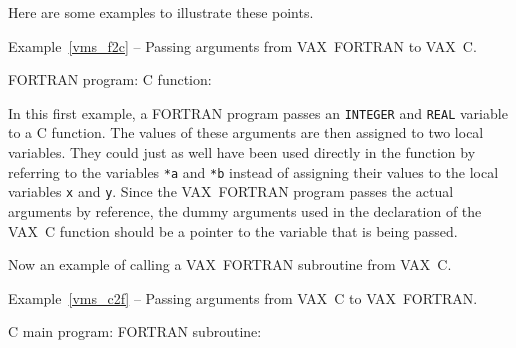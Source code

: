 \documentclass[twoside,11pt]{article}
\newcommand{\latex}[1]{#1}
\renewcommand{\_}{\texttt{\symbol{95}}}
\newcounter{examples}
\begin{document}
Here are some examples to illustrate these points. 

\label{vms_f2c}
\begin{center}
Example\latex{~\ref{vms_f2c}}
-- Passing arguments from VAX~FORTRAN to VAX~C\@.
\end{center}
\nopagebreak[4]
FORTRAN program:
\pagebreak[1]
C function:

In this first example, a FORTRAN program passes an \texttt{INTEGER} and 
\texttt{REAL} variable to a C function. 
The values of these arguments are then assigned to two local
variables. They could just as well have been used directly in the function by
referring to the variables  \texttt{*a} and \texttt{*b} instead of
assigning their values to the local variables \texttt{x} and \texttt{y}. 
Since the VAX~FORTRAN program passes the actual arguments by reference, the 
dummy arguments used in the declaration of the VAX~C function should be a 
pointer to the variable that is being passed.

Now an example of calling a VAX~FORTRAN subroutine from VAX~C\@.

\pagebreak[3]
\label{vms_c2f}
\begin{center}
Example\latex{~\ref{vms_c2f}}
-- Passing arguments from VAX~C to VAX~FORTRAN\@.
\end{center}
\nopagebreak[4]
C main program:
\pagebreak[1]
FORTRAN subroutine:
\end{document}
